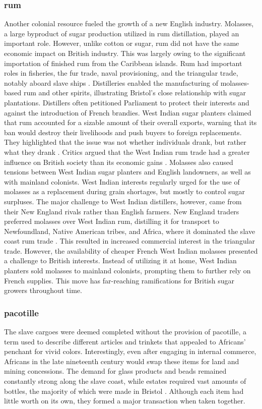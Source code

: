 \subsubsection{rum}
Another colonial resource fueled the growth of a new English industry. Molasses, a large byproduct of sugar production utilized in rum distillation, played an important role. However, unlike cotton or sugar, rum did not have the same economic impact on British industry. This was largely owing to the significant importation of finished rum from the Caribbean islands. Rum had important roles in fisheries, the fur trade, naval provisioning, and the triangular trade, notably aboard slave ships . Distilleries enabled the manufacturing of molasses-based rum and other spirits, illustrating Bristol's close relationship with sugar plantations. Distillers often petitioned Parliament to protect their interests and against the introduction of French brandies. West Indian sugar planters claimed that rum accounted for a sizable amount of their overall exports, warning that its ban would destroy their livelihoods and push buyers to foreign replacements. They highlighted that the issue was not whether individuals drank, but rather what they drank . Critics argued that the West Indian rum trade had a greater influence on British society than its economic gains . Molasses also caused tensions between West Indian sugar planters and English landowners, as well as with mainland colonists. West Indian interests regularly urged for the use of molasses as a replacement during grain shortages, but mostly to control sugar surpluses. The major challenge to West Indian distillers, however, came from their New England rivals rather than English farmers. New England traders preferred molasses over West Indian rum, distilling it for transport to Newfoundland, Native American tribes, and Africa, where it dominated the slave coast rum trade . This resulted in increased commercial interest in the triangular trade. However, the availability of cheaper French West Indian molasses presented a challenge to British interests. Instead of utilizing it at home, West Indian planters sold molasses to mainland colonists, prompting them to further rely on French supplies. This move has far-reaching ramifications for British sugar growers throughout time.
\subsubsection{pacotille}
The slave cargoes were deemed completed without the provision of pacotille, a term used to describe different articles and trinkets that appealed to Africans' penchant for vivid colors. Interestingly, even after engaging in internal commerce, Africans in the late nineteenth century would swap these items for land and mining concessions. The demand for glass products and beads remained constantly strong along the slave coast, while estates required vast amounts of bottles, the majority of which were made in Bristol . Although each item had little worth on its own, they formed a major transaction when taken together.
